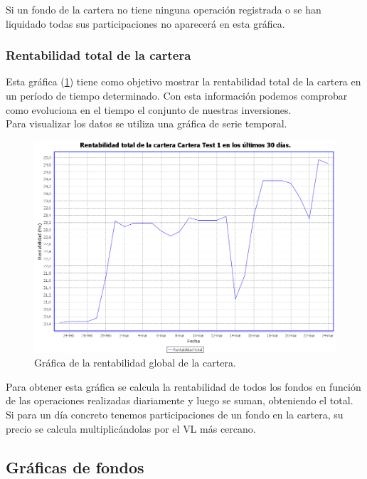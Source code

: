 \documentclass[12pt, a4paper]{book}
\begin{document}
Si un fondo de la cartera no tiene ninguna operación registrada o se han liquidado todas sus participaciones no aparecerá en esta gráfica.

\newpage

\subsubsection{Rentabilidad total de la cartera}

Esta gráfica (\ref{fig:renttotal}) tiene como objetivo mostrar la rentabilidad total de la cartera en un período de tiempo determinado. Con esta información podemos comprobar como evoluciona en el tiempo el conjunto de nuestras inversiones.\\

Para visualizar los datos se utiliza una gráfica de serie temporal.

	\begin{figure}[htbp]
	\centering
	\includegraphics[width=\textwidth]{figuras/renttotal.PNG}
	\caption{Gráfica de la rentabilidad global de la cartera.}
	\label{fig:renttotal}
	\end {figure}


Para obtener esta gráfica se calcula la rentabilidad de todos los fondos en función de las operaciones realizadas diariamente y luego se suman, obteniendo el total. Si para un día concreto tenemos participaciones de un fondo en la cartera, su precio se calcula multiplicándolas por el \gls{VL} más cercano.
\newpage

\subsection{Gráficas de fondos}
\end{document}
